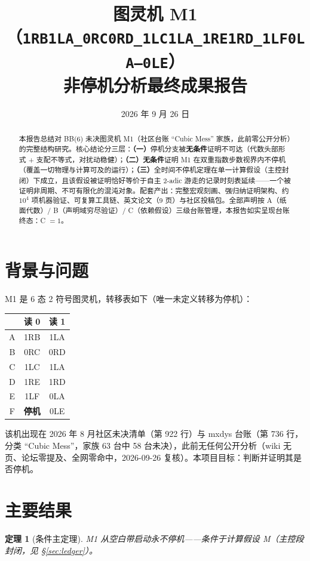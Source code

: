 \documentclass[11pt]{ctexart}
\title{\bfseries 图灵机 M1（\texttt{1RB1LA\_0RC0RD\_1LC1LA\_1RE1RD\_1LF0LA---0LE}）\\ \large 非停机分析最终成果报告}
\author{}
\date{2026 年 9 月 26 日}
\newtheorem{theorem}{定理}[section]
\theoremstyle{definition}
\begin{document}
\maketitle

\begin{abstract}
本报告总结对 BB(6) 未决图灵机 M1（社区台账 ``Cubic Mess'' 家族，此前零公开分析）的完整结构研究。核心结论分三层：\textbf{（一）}停机分支被\textbf{无条件}证明不可达（代数头部形式 + 支配不等式，对扰动稳健）；\textbf{（二）}\textbf{无条件}证明 M1 在双重指数步数视界内不停机（覆盖一切物理与计算可及的运行）；\textbf{（三）}全时间不停机定理在单一计算假设（主控封闭）下成立，且该假设被证明恰好等价于自主 2-adic 游走的记录时刻表延续——一个被证明非周期、不可有限化的混沌对象。配套产出：完整宏观刻画、强归纳证明架构、约 $10^4$ 项机器验证、可复算工具链、英文论文（9 页）与社区投稿包。全部声明按 A（纸面代数）/ B（声明域穷尽验证）/ C（依赖假设）三级台账管理，本报告如实呈现台账终态：C $=1$。
\end{abstract}

\section{背景与问题}

M1 是 6 态 2 符号图灵机，转移表如下（唯一未定义转移为停机）：

\begin{table}[h]
\centering
\begin{tabular}{c|cc}
 & 读 0 & 读 1\\\toprule
A & 1RB & 1LA\\
B & 0RC & 0RD\\
C & 1LC & 1LA\\
D & 1RE & 1RD\\
E & 1LF & 0LA\\
F & \textbf{停机} & 0LE\\
\end{tabular}
\end{table}

该机出现在 2026 年 8 月社区未决清单（第 922 行）与 mxdys 台账（第 736 行，分类 ``Cubic Mess''，家族 63 台中 58 台未决），此前无任何公开分析（wiki 无页、论坛零提及、全网零命中，2026-09-26 复核）。本项目目标：判断并证明其是否停机。

\section{主要结果}

\begin{theorem}[条件主定理]\label{thm:main}
M1 从空白带启动永不停机——条件于计算假设 M（主控段封闭，见 \S\ref{sec:ledger}）。
\end{theorem}
\end{document}
